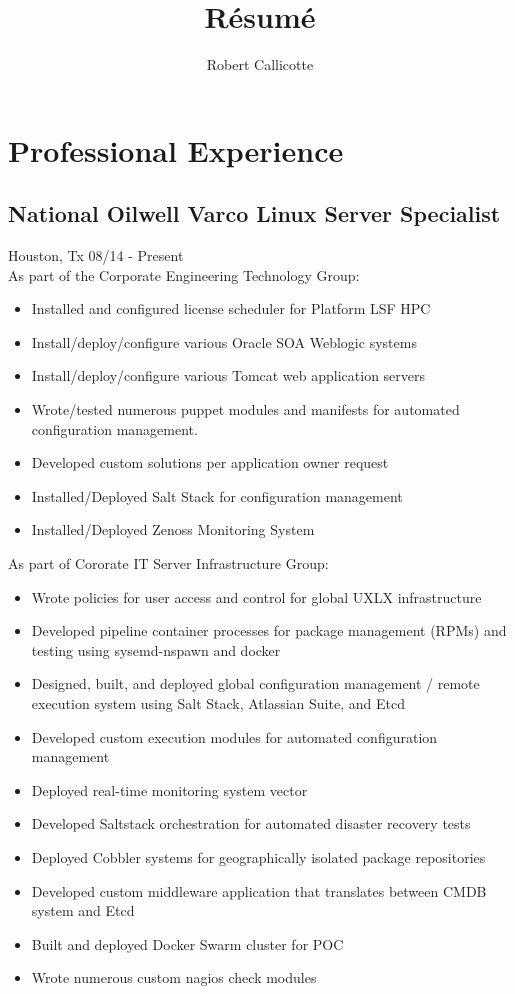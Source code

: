 \documentclass{article}
\title{R\'esum\'e}
\author{Robert Callicotte}
\begin{document}
\maketitle

\section{Professional Experience}
  \subsection{National Oilwell Varco \hfill Linux Server Specialist}
  Houston, Tx \hfill 08/14 - Present\\
  
  As part of the Corporate Engineering Technology Group:\\
  \begin{itemize}
  \item Installed and configured license scheduler for Platform LSF HPC
  \item Install/deploy/configure various Oracle SOA Weblogic systems
  \item Install/deploy/configure various Tomcat web application servers
  \item Wrote/tested numerous puppet modules and manifests for automated configuration management.
  \item Developed custom solutions per application owner request
  \item Installed/Deployed Salt Stack for configuration management
  \item Installed/Deployed Zenoss Monitoring System
  \end{itemize}  

  As part of Cororate IT Server Infrastructure Group:\\
  \begin{itemize}
  \item Wrote policies for user access and control for global UXLX infrastructure
  \item Developed pipeline container processes for package management (RPMs) and testing using sysemd-nspawn and docker
  \item Designed, built, and deployed global configuration management / remote execution system using Salt Stack, Atlassian Suite, and Etcd
  \item Developed custom execution modules for automated configuration management
  \item Deployed real-time monitoring system vector
  \item Developed Saltstack orchestration for automated disaster recovery tests
  \item Deployed Cobbler systems for geographically isolated package repositories
  \item Developed custom middleware application that translates between CMDB system and Etcd
  \item Built and deployed Docker Swarm cluster for POC
  \item Wrote numerous custom nagios check modules
  \end{itemize}
\end{document}

